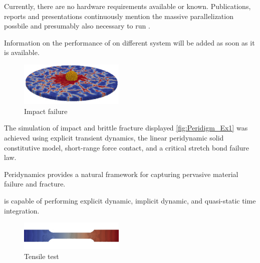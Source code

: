 
Currently, there are no hardware requirements available or known. Publications, reports and presentations continuously mention the massive parallelization possbile and presumably also necessary to run \marktool[\tooladdress]{\toolnameshort}.

Information on the performance of \marktool[\tooladdress]{\toolnameshort} on different system will be added as soon as it is available.



\begin{figure}
\includegraphics[width=5.0cm]{Figures/Peridigm_slide-image-1}
\caption{Impact failure}
\label{fig:Peridigm_Ex1}
\end{figure}

The simulation of impact and brittle fracture displayed \autoref{fig:Peridigm_Ex1} was achieved using explicit transient dynamics, the linear peridynamic solid constitutive model, short-range force contact, and a critical stretch bond failure law. \par Peridynamics provides a natural framework for capturing pervasive material failure and fracture.


\marktool[\tooladdress]{\toolnameshort} is capable of performing explicit dynamic, implicit dynamic, and quasi-static time integration.

\begin{figure}
\includegraphics[width=5.0cm]{Figures/Peridigm_slide-image-2}
\caption{Tensile test}
\label{fig:Peridigm_Ex2}
\end{figure}

